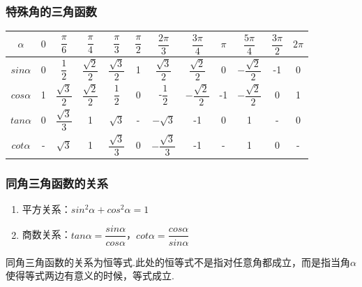 \subsubsection*{特殊角的三角函数}
\begin{table}[h]
    \centering
    \tabcolsep=0.4cm
    \renewcommand\arraystretch{2}
    \begin{tabular}{c|ccccccccccc}
        \hline
        $\alpha$ & $0$ & $\dfrac{\pi}{6}$ & $\dfrac{\pi}{4}$ & $\dfrac{\pi}{3}$ & $\dfrac{\pi}{2}$ & $\dfrac{2\pi}{3}$ & $\dfrac{3\pi}{4}$ & $\pi$ & $\dfrac{5\pi}{4}$ & $\dfrac{3\pi}{2}$ & $2\pi$ \\
        \hline
        $sin\alpha$ & 0 & $\dfrac{1}{2}$ & $\dfrac{\sqrt{2}}{2}$ & $\dfrac{\sqrt{3}}{2}$ & 1 & $\dfrac{\sqrt{3}}{2}$ & $\dfrac{\sqrt{2}}{2}$ & 0 & $-\dfrac{\sqrt{2}}{2}$ & -1 & 0 \\
        $cos\alpha$ & 1 & $\dfrac{\sqrt{3}}{2}$ & $\dfrac{\sqrt{2}}{2}$ & $\dfrac{1}{2}$ & 0 & -$\dfrac{1}{2}$ & $-\dfrac{\sqrt{2}}{2}$ & -1 & $-\dfrac{\sqrt{2}}{2}$ & 0 & 1 \\
        $tan\alpha$ & 0 & $\dfrac{\sqrt{3}}{3}$ & 1 & $\sqrt{3}$ & - & $-\sqrt{3}$ & -1 & 0 & 1 & - & 0 \\
        $cot\alpha$ & - & $\sqrt{3}$ & 1 & $\dfrac{\sqrt{3}}{3}$ & 0 & $-\dfrac{\sqrt{3}}{3}$ & -1 & - & 1 & 0 & - \\
        \hline
    \end{tabular}
\end{table}
\subsubsection*{同角三角函数的关系}
\begin{enumerate}
    \item 平方关系：$sin^2\alpha + cos^2\alpha = 1$
    \item 商数关系：$tan\alpha = \dfrac{sin\alpha}{cos\alpha}$，$cot\alpha = \dfrac{cos\alpha}{sin\alpha}$
\end{enumerate}
同角三角函数的关系为恒等式.此处的恒等式不是指对任意角都成立，而是指当角$\alpha$使得等式两边有意义的时候，等式成立.

